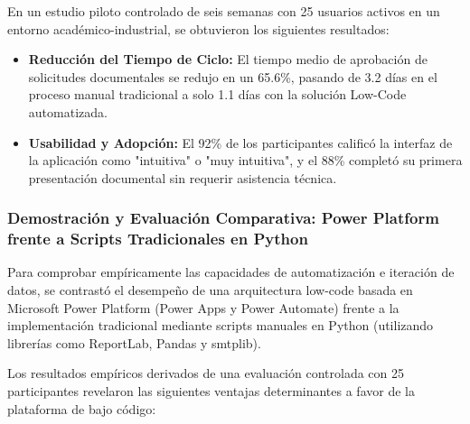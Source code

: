En un estudio piloto controlado de seis semanas con 25 usuarios activos en un entorno académico-industrial, se obtuvieron los siguientes resultados:

\begin{itemize}
    \item \textbf{Reducción del Tiempo de Ciclo:} El tiempo medio de aprobación de solicitudes documentales se redujo en un 65.6\%, pasando de 3.2 días en el proceso manual tradicional a solo 1.1 días con la solución Low-Code automatizada.
    \item \textbf{Usabilidad y Adopción:} El 92\% de los participantes calificó la interfaz de la aplicación como "intuitiva" o "muy intuitiva", y el 88\% completó su primera presentación documental sin requerir asistencia técnica.
\end{itemize}

\subsubsection{Demostración y Evaluación Comparativa: Power Platform frente a Scripts Tradicionales en Python}

Para comprobar empíricamente las capacidades de automatización e iteración de datos, se contrastó el desempeño de una arquitectura low-code basada en Microsoft Power Platform (Power Apps y Power Automate) frente a la implementación tradicional mediante scripts manuales en Python (utilizando librerías como ReportLab, Pandas y smtplib).

Los resultados empíricos derivados de una evaluación controlada con 25 participantes revelaron las siguientes ventajas determinantes a favor de la plataforma de bajo código:

